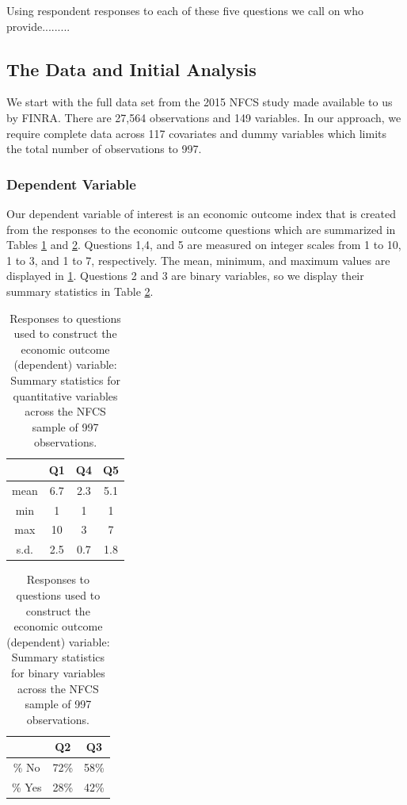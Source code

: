 \documentclass[12pt]{article}
\renewcommand{\arraystretch}{0.7}
\theoremstyle{plain}
\begin{document}
Using respondent responses to each of these five questions we call on  \cite{wittkowski2004combining} who provide.........


\subsection{The Data and Initial Analysis} \label{initial}
We start with the full data set from the 2015 NFCS study made available to us by FINRA.  There are 27,564 observations and 149 variables.  In our approach, we require complete data across 117 covariates and dummy variables which limits the total number of observations to 997.  

\subsubsection{Dependent Variable}

Our dependent variable of interest is an economic outcome index that is created from the responses to the economic outcome questions which are summarized in Tables \ref{tab:dependents} and \ref{tab:dependents2}.  Questions 1,4, and 5 are measured on integer scales from 1 to 10, 1 to 3, and 1 to 7, respectively.  The mean, minimum, and maximum values  are displayed in \ref{tab:dependents}.  Questions 2 and 3 are binary variables, so we display their summary statistics in Table \ref{tab:dependents2}.

\begin{table}[H]
\centering
\caption{Responses to questions used to construct the economic outcome (dependent) variable: Summary statistics for quantitative variables across the NFCS sample of 997 observations.}
\renewcommand{\arraystretch}{1}
\begin{tabular} {|c|c|c|c|}

\hline
\ & \textbf{Q1} & \textbf{Q4} & \textbf{Q5} \\ [0.5ex] 
 \hline\hline
 mean & 6.7 & 2.3 & 5.1 \\
  \hline
 min & 1 & 1 & 1 \\
  \hline
 max & 10 & 3 & 7\\
  \hline
 s.d. & 2.5 & 0.7 & 1.8\\
 \hline
\end{tabular}
\label{tab:dependents}
\end{table}

\begin{table}[H]
\centering
\caption{Responses to questions used to construct the economic outcome (dependent) variable: Summary statistics for binary variables across the NFCS sample of 997 observations.}
\renewcommand{\arraystretch}{1}
\begin{tabular} {|c|c|c|}

 \hline
\ & \textbf{Q2} & \textbf{{Q3}}\\ [0.5ex] 
 \hline \hline
\% No & 72\% & 58\% \\
 \hline
\% Yes & 28\% & 42\%  \\
 \hline
\end{tabular}
\label{tab:dependents2}
\end{table}
\end{document}

